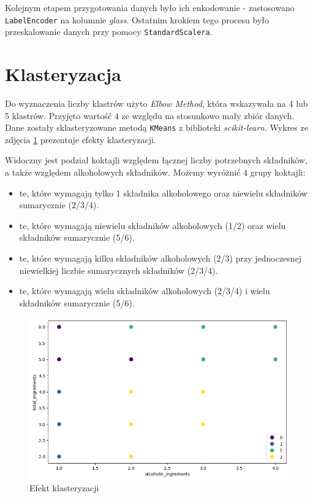 \documentclass{article}
\newcommand{\code}[1]{\colorbox{light-gray}{\texttt{#1}}}
\begin{document}
Kolejnym etapem przygotowania danych było ich enkodowanie - zastosowano \code{LabelEncoder} na kolumnie \textit{glass}. Ostatnim krokiem tego procesu było przeskalowanie danych przy pomocy \code{StandardScalera}.


\section{Klasteryzacja}
Do wyznaczenia liczby klastrów użyto \textit{Elbow Method}, która wskazywała na 4 lub 5 klastrów. Przyjęto wartość 4 ze względu na stosunkowo mały zbiór danych. Dane zostały sklasteryzowane metodą \code{KMeans} z biblioteki \textit{scikit-learn}. Wykres ze zdjęcia \ref{fig:results} prezentuje efekty klasteryzacji.

Widoczny jest podział koktajli względem łącznej liczby potrzebnych składników, a także względem alkoholowych składników. Możemy wyróżnić 4 grupy koktajli:
\begin{itemize}
    \item te, które wymagają tylko 1 składnika alkoholowego oraz niewielu składników sumarycznie (2/3/4).
    \item te, które wymagają niewielu składników alkoholowych (1/2) oraz wielu składników sumarycznie (5/6).
    \item te, które wymagają kilku składników alkoholowych (2/3) przy jednoczesnej niewielkiej liczbie sumarycznych składników (2/3/4).
    \item te, które wymagają wielu składników alkoholowych (2/3/4) i wielu składników sumarycznie (5/6).
\end{itemize}

\clearpage

\begin{figure}[!htbp]%
    \centering
    \includegraphics[width=\textwidth]{clusters.png}
    \caption{Efekt klasteryzacji}%
    \label{fig:results}
\end{figure}
\end{document}

